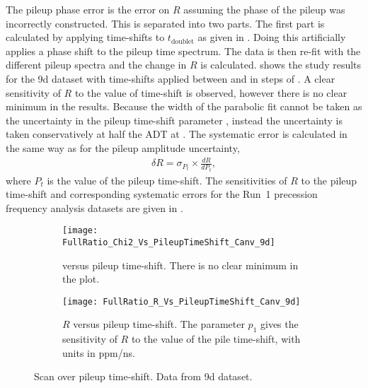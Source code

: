 The pileup phase error is the error on $R$ assuming the phase of the pileup was incorrectly constructed. This is separated into two parts. The first part is calculated by applying time-shifts to $t_{\text{doublet}}$ as given in . Doing this artificially applies a phase shift to the pileup time spectrum. The data is then re-fit with the different pileup spectra and the change in $R$ is calculated.  shows the study results for the 9d dataset with time-shifts applied between  and  in steps of . A clear sensitivity of $R$ to the value of time-shift is observed, however there is no clear minimum in the \chisq results. Because the width of the \chisq parabolic fit cannot be taken as the uncertainty in the pileup time-shift parameter , instead the uncertainty is taken conservatively at half the ADT at . The systematic error is calculated in the same way as for the pileup amplitude uncertainty,
    \begin{align}
        \delta R = \sigma_{P_{t}} \times \frac{dR}{dP_{t}},
    \end{align}
where $P_{t}$ is the value of the pileup time-shift. The sensitivities of $R$ to the pileup time-shift and corresponding systematic errors for the Run~1 precession frequency analysis datasets are given in .


\begin{figure}
\centering
    \begin{subfigure}[t]{0.45\textwidth}
        \centering
        \texttt{[image: FullRatio\_Chi2\_Vs\_PileupTimeShift\_Canv\_9d]}
        \caption{\chisq versus pileup time-shift. There is no clear minimum in the plot.} 
    \end{subfigure}%
    \hspace{1cm}
    \begin{subfigure}[t]{0.45\textwidth}
        \centering
        \texttt{[image: FullRatio\_R\_Vs\_PileupTimeShift\_Canv\_9d]}
        \caption{$R$ versus pileup time-shift. The parameter $p_{1}$ gives the sensitivity of $R$ to the value of the pile time-shift, with units in ppm/ns.}
    \end{subfigure}
\caption[Pileup time-shift scan]{Scan over pileup time-shift. Data from 9d dataset.}
\label{fig:PTSscan}
\end{figure}


